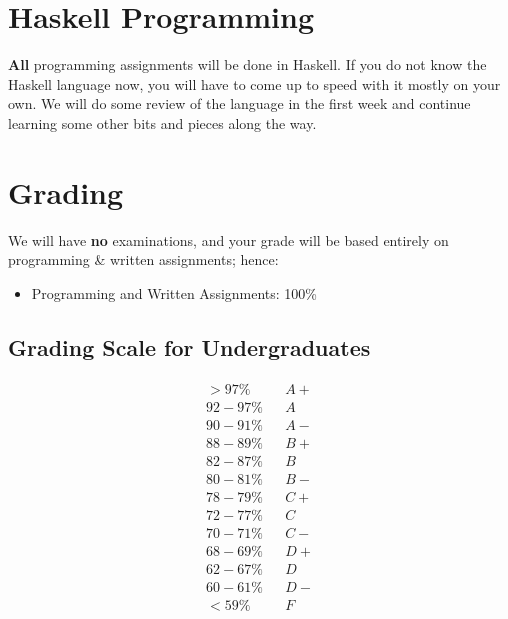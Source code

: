 \documentclass[11pt]{article}
\begin{document}
\section{Haskell Programming}

{\bf All} programming assignments will be done in Haskell. If you do not know the Haskell language now, you will have to come up to speed with it mostly on your own. We will do some review of the language in the first week and continue learning some other bits and pieces along the way.


%



\section{Grading}

We will have {\bf no} examinations, and your grade will be based entirely on programming \& written assignments; hence:
\begin{itemize}
\item Programming and Written Assignments: 100\%
\end{itemize}


\subsection*{Grading Scale for Undergraduates}
\[
\begin{array}{lcl}
> 97\%	&&A+ \\
92-97\%	&&A \\
90-91\%	&&A- \\
88-89\%	&&B+ \\
82-87\%	&&B \\
80-81\%	&&B- \\
78-79\%	&&C+ \\
72-77\%	&&C \\
70-71\%	&&C- \\
68-69\%	&&D+ \\
62-67\%	&&D \\
60-61\%	&&D- \\
< 59\%	&&F
\end{array}
\]
\end{document}
